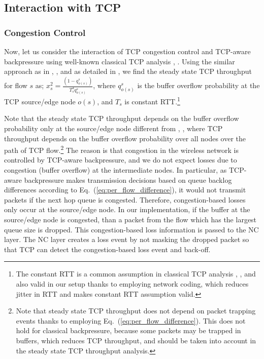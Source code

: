 \documentclass[conference]{IEEEtran}
\begin{document}
\subsection{Interaction with TCP}

\subsubsection{Congestion Control}
Now, let us consider the interaction of TCP congestion control and TCP-aware backpressure using well-known classical TCP analysis \cite{twsly_tcp}, \cite{low_tcp}. Using the similar approach as in \cite{twsly_tcp}, \cite{low_tcp}, and as detailed in \cite{tcp_aware_bp_tech_rep}, we find the steady state TCP throughput for flow $s$ as; $x_{s}^{2} = \frac{(1-q_{o(s)}^{s})}{T_{s}^{3}q_{o(s)}^{s}}$, where $q_{o(s)}^{s}$ is the buffer overflow probability at the TCP source/edge node $o(s)$, and $T_s$ is constant RTT.\footnote{\scriptsize The constant RTT is a common assumption in classical TCP analysis \cite{twsly_tcp}, \cite{low_tcp}, and also valid in our setup thanks to employing network coding, which reduces jitter in RTT and makes constant RTT assumption valid.}

Note that the steady state TCP throughput depends on the buffer overflow probability only at the source/edge node different from \cite{twsly_tcp}, \cite{low_tcp}, where TCP throughput depends on the buffer overflow probability over all nodes over the path of TCP flow.\footnote{\scriptsize Note that steady state TCP throughput does not depend on packet trapping events thanks to employing Eq.~(\ref{eq:per_flow_difference}). This does not hold for classical backpressure, because some packets may be trapped in buffers, which reduces TCP throughput, and should be taken into account in the steady state TCP throughput analysis.} The reason is that congestion in the wireless network is controlled by TCP-aware backpressure, and we do not expect losses due to congestion (buffer overflow) at the intermediate nodes. In particular, as TCP-aware backpressure makes transmission decisions based on queue backlog differences according to Eq.~(\ref{eq:per_flow_difference}), it would not transmit packets if the next hop queue is congested. Therefore, congestion-based losses only occur at the source/edge node. In our implementation, if the buffer at the source/edge node is congested, than a packet from the flow which has the largest queue size is dropped. This congestion-based loss information is passed to the NC layer. The NC layer creates a loss event by not masking the dropped packet so that TCP can detect the congestion-based loss event and back-off. 
\end{document}
